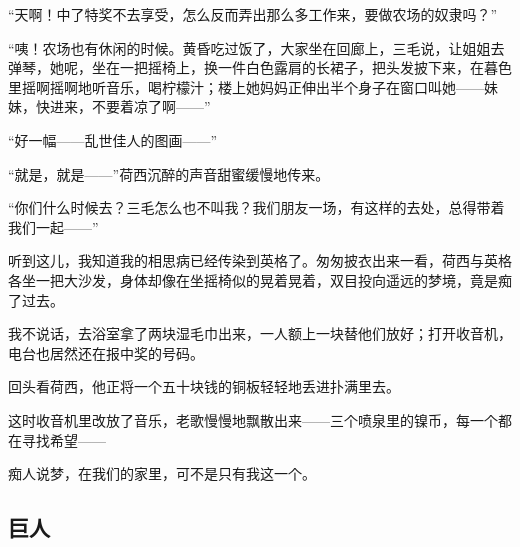 \par “天啊！中了特奖不去享受，怎么反而弄出那么多工作来，要做农场的奴隶吗？”
\par “咦！农场也有休闲的时候。黄昏吃过饭了，大家坐在回廊上，三毛说，让姐姐去弹琴，她呢，坐在一把摇椅上，换一件白色露肩的长裙子，把头发披下来，在暮色里摇啊摇啊地听音乐，喝柠檬汁；楼上她妈妈正伸出半个身子在窗口叫她——妹妹，快进来，不要着凉了啊——”
\par “好一幅——乱世佳人的图画——”
\par “就是，就是——”荷西沉醉的声音甜蜜缓慢地传来。
\par “你们什么时候去？三毛怎么也不叫我？我们朋友一场，有这样的去处，总得带着我们一起——”
\par 听到这儿，我知道我的相思病已经传染到英格了。匆匆披衣出来一看，荷西与英格各坐一把大沙发，身体却像在坐摇椅似的晃着晃着，双目投向遥远的梦境，竟是痴了过去。
\par 我不说话，去浴室拿了两块湿毛巾出来，一人额上一块替他们放好；打开收音机，电台也居然还在报中奖的号码。
\par 回头看荷西，他正将一个五十块钱的铜板轻轻地丢进扑满里去。
\par 这时收音机里改放了音乐，老歌慢慢地飘散出来——三个喷泉里的镍币，每一个都在寻找希望——
\par 痴人说梦，在我们的家里，可不是只有我这一个。

\subsection{巨人}

